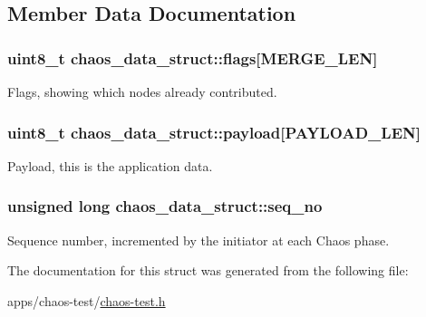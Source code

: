 \subsection{Member Data Documentation}
\hypertarget{structchaos__data__struct_ac14c70edc5a438f0e5d3d2949ec363d0}{
\subsubsection[{flags}]{\setlength{\rightskip}{0pt plus 5cm}uint8\-\_\-t chaos\-\_\-data\-\_\-struct\-::flags\mbox{[}{\bf M\-E\-R\-G\-E\-\_\-\-L\-E\-N}\mbox{]}}}\label{structchaos__data__struct_ac14c70edc5a438f0e5d3d2949ec363d0}
Flags, showing which nodes already contributed. \hypertarget{structchaos__data__struct_ac64d81244298d24bfdf17123697d7fe7}{
\subsubsection[{payload}]{\setlength{\rightskip}{0pt plus 5cm}uint8\-\_\-t chaos\-\_\-data\-\_\-struct\-::payload\mbox{[}{\bf P\-A\-Y\-L\-O\-A\-D\-\_\-\-L\-E\-N}\mbox{]}}}\label{structchaos__data__struct_ac64d81244298d24bfdf17123697d7fe7}
Payload, this is the application data. \hypertarget{structchaos__data__struct_acefe9b2cac2bc7d3a0b40053d55ae879}{
\subsubsection[{seq\-\_\-no}]{\setlength{\rightskip}{0pt plus 5cm}unsigned long chaos\-\_\-data\-\_\-struct\-::seq\-\_\-no}}\label{structchaos__data__struct_acefe9b2cac2bc7d3a0b40053d55ae879}
Sequence number, incremented by the initiator at each Chaos phase. 

The documentation for this struct was generated from the following file\-:\begin{DoxyCompactItemize}
\item 
apps/chaos-\/test/\hyperlink{chaos-test_8h}{chaos-\/test.\-h}\end{DoxyCompactItemize}
